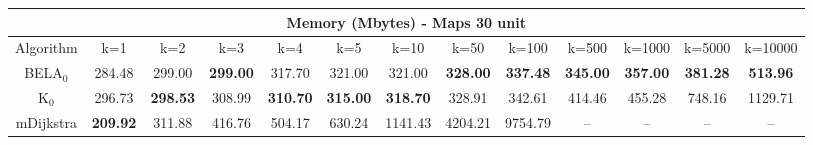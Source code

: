 \begin{tabular}{c|cccccccccccc}\toprule
\multicolumn{13}{c}{Memory (Mbytes) - Maps 30 unit}\\ \midrule
Algorithm & k=1 & k=2 & k=3 & k=4 & k=5 & k=10 & k=50 & k=100 & k=500 & k=1000 & k=5000 & k=10000 \\ \midrule
BELA$_0$ & 284.48 & 299.00 & \textbf{299.00} & 317.70 & 321.00 & 321.00 & \textbf{328.00} & \textbf{337.48} & \textbf{345.00} & \textbf{357.00} & \textbf{381.28} & \textbf{513.96} \\
K$_0$ & 296.73 & \textbf{298.53} & 308.99 & \textbf{310.70} & \textbf{315.00} & \textbf{318.70} & 328.91 & 342.61 & 414.46 & 455.28 & 748.16 & 1129.71 \\
mDijkstra & \textbf{209.92} & 311.88 & 416.76 & 504.17 & 630.24 & 1141.43 & 4204.21 & 9754.79 & -- & -- & -- & -- \\ \bottomrule 
\end{tabular}
